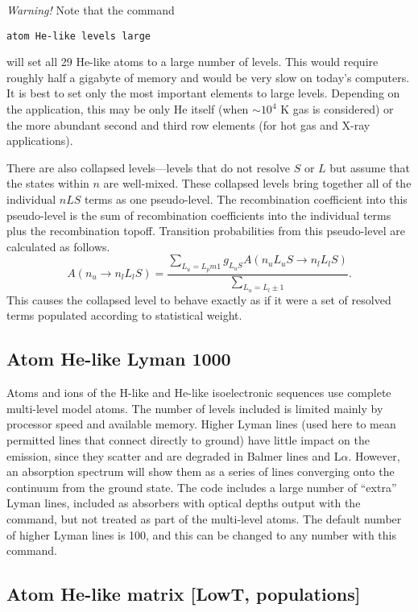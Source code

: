 \emph{Warning!}  Note that the command
\begin{verbatim}
atom He-like levels large
\end{verbatim}
will set all 29 He-like atoms to a large number of levels.
This would
require roughly half a gigabyte of memory and would be very slow
on today's computers.
It is best to set only the most important elements to large
levels.
Depending on the application, this may be only He itself (when
$\sim 10^4$ K gas is considered) or the more abundant second
and third row elements (for hot gas and X-ray applications).

There are also collapsed levels---levels that do not resolve
$S$ or $L$ but
assume that the states within $n$ are well-mixed.
These collapsed levels
bring together all of the individual $nLS$ terms as one pseudo-level.
The
recombination coefficient into this pseudo-level is the sum of recombination
coefficients into the individual terms plus the recombination topoff.
Transition probabilities from this pseudo-level are calculated as follows.
\begin{equation}
A(n_u \to n_lL_lS)= \frac{\sum_{L_u=L_pm 1} g_{L_{u}S} A(n_uL_uS\to
n_lL_lS)}{\sum_{L_u=L_l\pm 1}}.%
\end{equation}
This causes the collapsed level to behave exactly as if it were a set of
resolved terms populated according to statistical weight.

\subsection{Atom He-like Lyman 1000}

Atoms and ions of the H-like and He-like isoelectronic sequences use
complete multi-level model atoms.
The number of levels included is limited
mainly by processor speed and available memory.
Higher Lyman lines (used
here to mean permitted lines that connect directly to ground) have little
impact on the emission,
since they scatter and are degraded in Balmer lines
and L$\alpha $.
However, an absorption spectrum will show them as a series of lines
converging onto the continuum from the ground state.
The code includes
a large number of ``extra'' Lyman lines, included as absorbers with optical
depths output with the  command,
but not treated as part of the multi-level atoms.
The default
number of higher Lyman lines is 100, and this can be changed to any number
with this command.

\subsection{Atom He-like matrix [LowT, populations]}

